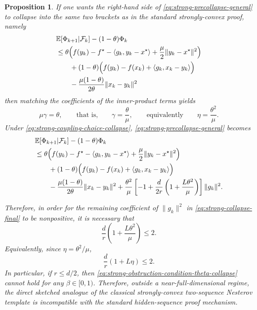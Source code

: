 \documentclass[10pt,a4paper]{amsart}
\newtheorem{proposition}{Proposition}
\begin{document}
\begin{proposition}
If one wants the right-hand side of \eqref{eq:strong-precollapse-general} to collapse into the same two brackets as in the standard strongly-convex proof, namely
\begin{align}
&\mathbb{E}\!\left[\Phi_{k+1}\middle|\mathcal F_k\right]-(1-\theta)\Phi_k
\notag\\
&\le
\theta\Bigl(
f(y_k)-f^\star-\langle g_k,y_k-x^\star\rangle+\frac{\mu}{2}\|y_k-x^\star\|^2
\Bigr)
\notag\\
&\qquad
+(1-\theta)\Bigl(
f(y_k)-f(x_k)+\langle g_k,x_k-y_k\rangle
\Bigr)
\notag\\
&\qquad
-\frac{\mu(1-\theta)}{2\theta}\|x_k-y_k\|^2
\label{eq:strong-desired-collapse}
\end{align}
then matching the coefficients of the inner-product terms yields
\begin{equation}
\mu\gamma=\theta,
\qquad\text{that is,}\qquad
\gamma=\frac{\theta}{\mu},
\qquad\text{equivalently}\qquad
\eta=\frac{\theta^2}{\mu}.
\label{eq:strong-coupling-choice-collapse}
\end{equation}
Under \eqref{eq:strong-coupling-choice-collapse}, \eqref{eq:strong-precollapse-general} becomes
\begin{align}
&\mathbb{E}\!\left[\Phi_{k+1}\middle|\mathcal F_k\right]-(1-\theta)\Phi_k
\notag\\
&\le
\theta\Bigl(
f(y_k)-f^\star-\langle g_k,y_k-x^\star\rangle+\frac{\mu}{2}\|y_k-x^\star\|^2
\Bigr)
\notag\\
&\qquad
+(1-\theta)\Bigl(
f(y_k)-f(x_k)+\langle g_k,x_k-y_k\rangle
\Bigr)
\notag\\
&\qquad
-\frac{\mu(1-\theta)}{2\theta}\|x_k-y_k\|^2
+\frac{\theta^2}{\mu}
\left[
-1+\frac{d}{2r}\left(1+\frac{L\theta^2}{\mu}\right)
\right]\|g_k\|^2.
\label{eq:strong-collapse-final}
\end{align}

Therefore, in order for the remaining coefficient of \(\|g_k\|^2\) in
\eqref{eq:strong-collapse-final} to be nonpositive, it is necessary that
\begin{equation}
\frac{d}{r}\left(1+\frac{L\theta^2}{\mu}\right)\le 2.
\label{eq:strong-obstruction-condition-theta-collapse}
\end{equation}
Equivalently, since \(\eta=\theta^2/\mu\),
\begin{equation}
\frac{d}{r}(1+L\eta)\le 2.
\label{eq:strong-obstruction-condition-eta-collapse}
\end{equation}
In particular, if \(r\le d/2\), then \eqref{eq:strong-obstruction-condition-theta-collapse}
cannot hold for any \(\beta\in[0,1)\).
Therefore, outside a near-full-dimensional regime, the direct sketched analogue of the
classical strongly-convex two-sequence Nesterov template is incompatible with the
standard hidden-sequence proof mechanism.
\end{proposition}
\end{document}
